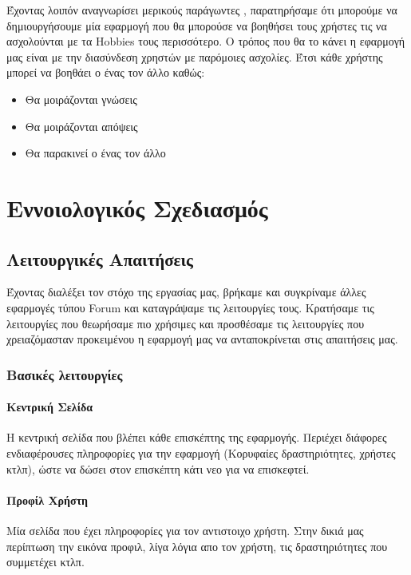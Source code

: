 \documentclass[nonacm, language=english, language=greek]{acmart}
\newcommand{\en}[1]{\textlatin{#1}}
\begin{document}
Έχοντας λοιπόν αναγνωρίσει μερικούς παράγωντες , παρατηρήσαμε ότι μπορούμε να δημιουργήσουμε μία εφαρμογή που θα μπορούσε να βοηθήσει τους χρήστες τις να ασχολούνται με τα \en{Hobbies} τους περισσότερο.
Ο τρόπος που θα το κάνει η εφαρμογή μας είναι με την διασύνδεση χρηστών με παρόμοιες ασχολίες.
Έτσι κάθε χρήστης μπορεί να βοηθάει ο ένας τον άλλο καθώς:
\begin{itemize}
    \item Θα μοιράζονται γνώσεις
    \item Θα μοιράζονται απόψεις
    \item Θα παρακινεί ο ένας τον άλλο
\end{itemize}

\section{Εννοιολογικός Σχεδιασμός}

\subsection{Λειτουργικές Απαιτήσεις}

Έχοντας διαλέξει τον στόχο της εργασίας μας, βρήκαμε και συγκρίναμε άλλες εφαρμογές τύπου \en{Forum} και καταγράψαμε τις λειτουργίες τους.
Κρατήσαμε τις λειτουργίες που θεωρήσαμε πιο χρήσιμες και προσθέσαμε τις λειτουργίες που χρειαζόμασταν προκειμένου η εφαρμογή μας να ανταποκρίνεται στις απαιτήσεις μας.

\subsubsection{Βασικές λειτουργίες}

\paragraph{Κεντρική Σελίδα} 
Η κεντρική σελίδα που βλέπει κάθε επισκέπτης της εφαρμογής. Περιέχει διάφορες
ενδιαφέρουσες πληροφορίες για την εφαρμογή (Κορυφαίες δραστηριότητες, χρήστες
κτλπ), ώστε να δώσει στον επισκέπτη κάτι νεο για να επισκεφτεί.
 
\paragraph{Προφίλ Χρήστη}
Μία σελίδα που έχει πληροφορίες για τον αντιστοιχο χρήστη. Στην δικιά μας περίπτωση την εικόνα προφιλ, λίγα λόγια απο τον χρήστη, τις δραστηριότητες που συμμετέχει κτλπ.
 
\end{document}
